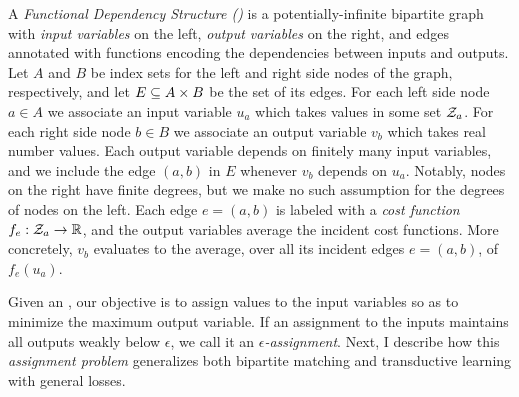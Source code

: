 A \emph{Functional Dependency Structure (\fds)} is a potentially-infinite bipartite graph with \emph{input variables}   on the left, \emph{output variables}  on the right, and edges annotated with functions encoding the dependencies between inputs and outputs. Let $A$ and $B$ be index sets for the left and right side nodes of the graph, respectively, and let $E \subseteq A \times B$ be the set of its edges. For each left side node $a \in A$ we associate an input variable $u_a$ which takes values in some set $\mathcal{Z}_a$. For each right side node $b \in B$ we associate an output variable $v_b$ which takes real number values. Each output variable depends on finitely many input variables, and we include the edge $(a,b)$ in $E$ whenever $v_b$ depends on $u_a$.  Notably, nodes on the right have finite degrees, but we make no such assumption for the degrees of nodes on the left.
Each edge $e=(a,b)$ is labeled with a \emph{cost function} $f_{e}: \mathcal{Z}_a \to \mathbb{R}$, and the output variables average the incident cost functions. More concretely,  $v_b$ evaluates to the average, over all its incident edges $e=(a,b)$,  of $f_{e}(u_a)$. %



Given an \fds, our objective is to assign values to the input variables so as to minimize the maximum output variable. If an assignment to the inputs maintains all outputs  weakly below $\epsilon$, we call it an \emph{$\epsilon$-assignment}.
%
%
Next, I describe how this \emph{\fds assignment problem} generalizes both bipartite matching and transductive learning with general losses. 


